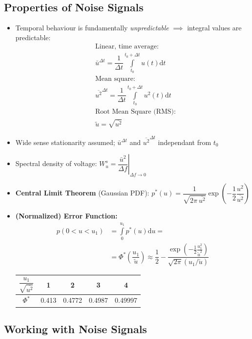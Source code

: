 \subsection{Properties of Noise Signals}
\begin{itemize}
    \item Temporal behaviour is fundamentally \textit{unpredictable} $\implies$ integral values are predictable:
        \begin{align*}
            &\text{Linear, time average:}\\
            &\bar{u}^{\Delta t} = \dfrac{1}{\Delta t}\int\limits^{t_0+\Delta t}_{t_0} u(t) \mathrm{d}t\\
            &\text{Mean square:}\\
            &\overline{u^2}^{\Delta t} = \dfrac{1}{\Delta t}\int\limits^{t_0+\Delta t}_{t_0} u^2(t) \mathrm{d}t\\
            &\text{Root Mean Square (RMS):}\\
            &\tilde{u}=\sqrt{\overline{u^2}}
        \end{align*}
    \item Wide sense stationarity assumed; $\bar{u}^{\Delta t}$ and $\overline{u^2}^{\Delta t}$ independant from $t_0$
    \item Spectral density of voltage: \(W_u^s = \left.\dfrac{\bar{u}^2}{\Delta f}\right|_{\Delta f \to 0}\)
    \item \textbf{Central Limit Theorem} (Gaussian PDF):
        \(p^*(u) = \dfrac{1}{\sqrt{2\pi\:\overline{u^2}}}\exp\left(- \dfrac{1}{2}\dfrac{u^2}{\overline{u^2}}\right)\)
    \item \textbf{(Normalized) Error Function:}
        \begin{align*}
            p(0<u<u_1) &= \int\limits_0^{u_1} p^*(u)\mathrm{d}u =\\
            &= \Phi^*\left(\dfrac{u_1}{\tilde{u}}\right) \approx \dfrac{1}{2} - \dfrac{\exp(-\frac{1}{2}\frac{u_1^2}{\tilde{u}^2})}{\sqrt{2\pi}(u_1/\tilde{u})}
        \end{align*}
        \begin{tabular}{|c|c|c|c|c|}\hline
            $\dfrac{u_1}{\sqrt{\overline{u^2}}}$ & 1 & 2 & 3 & 4\\\hline
            $\Phi^*$ & 0.413 & 0.4772 & 0.4987 & 0.49997\\\hline
        \end{tabular}
\end{itemize}

\subsection{Working with Noise Signals}
